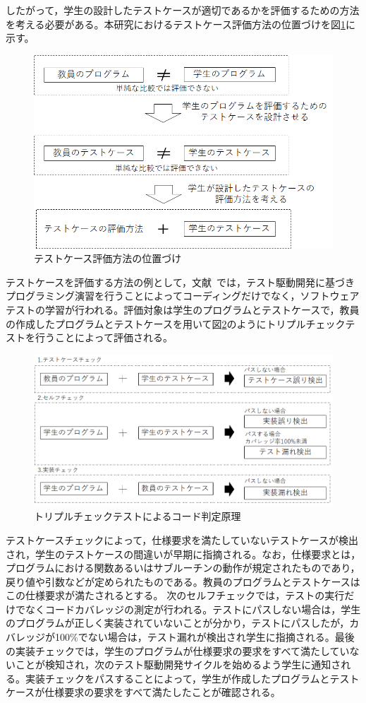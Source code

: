 \documentclass{tpu-sotu}
\begin{document}
したがって，学生の設計したテストケースが適切であるかを評価するための方法を考える必要がある。本研究におけるテストケース評価方法の位置づけを図\ref{a1}に示す。
\begin{figure}[h]
  \centering
  \includegraphics[width=130mm]{テストケース評価方法の位置づけ.png}
  \caption{テストケース評価方法の位置づけ}
  \label{a1}
\end{figure}
\newpage
テストケースを評価する方法の例として，文献~\cite{a0}では，テスト駆動開発に基づきプログラミング演習を行うことによってコーディングだけでなく，ソフトウェアテストの学習が行われる。評価対象は学生のプログラムとテストケースで，教員の作成したプログラムとテストケースを用いて図\ref{a2}のようにトリプルチェックテストを行うことによって評価される。
\newpage
\begin{figure}[h]
  \centering
  \includegraphics[width=130mm]{トリプルチェック.png}
  \caption{トリプルチェックテストによるコード判定原理}
  \label{a2}
\end{figure}

テストケースチェックによって，仕様要求を満たしていないテストケースが検出され，学生のテストケースの間違いが早期に指摘される。なお，仕様要求とは，プログラムにおける関数あるいはサブルーチンの動作が規定されたものであり，戻り値や引数などが定められたものである。教員のプログラムとテストケースはこの仕様要求が満たされるとする。
次のセルフチェックでは，テストの実行だけでなくコードカバレッジの測定が行われる。テストにパスしない場合は，学生のプログラムが正しく実装されていないことが分かり，テストにパスしたが，カバレッジが100\%でない場合は，テスト漏れが検出され学生に指摘される。最後の実装チェックでは，学生のプログラムが仕様要求の要求をすべて満たしていないことが検知され，次のテスト駆動開発サイクルを始めるよう学生に通知される。実装チェックをパスすることによって，学生が作成したプログラムとテストケースが仕様要求の要求をすべて満たしたことが確認される。
\end{document}
